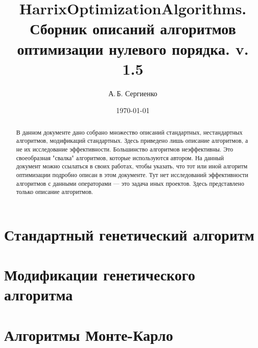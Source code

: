 \documentclass[a4paper,12pt]{article}
\title{HarrixOptimizationAlgorithms. Сборник описаний алгоритмов оптимизации нулевого порядка. v. 1.5}
\author{А.\,Б. Сергиенко}
\date{\today}
\begin{document}


\maketitle

\begin{abstract}
В данном документе дано собрано множество описаний стандартных, нестандартных алгоритмов, модификаций стандартных. Здесь приведено лишь описание алгоритмов, а не их исследование эффективности. Большинство алгоритмов неэффективны. Это своеобразная "свалка" алгоритмов, которые используются автором. На данный документ можно ссылаться в своих работах, чтобы указать, что тот или иной алгоритм оптимизации подробно описан в этом документе. Тут нет исследований эффективности алгоритмов с данными операторами --- это задача иных проектов. Здесь представлено только описание алгоритмов.
\end{abstract}

\tableofcontents

\newpage









\section{Стандартный генетический алгоритм}\label{HarrixOptimizationAlgorithms:GA}




\section{Модификации генетического алгоритма}\label{HarrixOptimizationAlgorithms:ModGA}










\section{Алгоритмы Монте-Карло}\label{HarrixOptimizationAlgorithms:MonteCarlo}




\newpage
\end{document}

